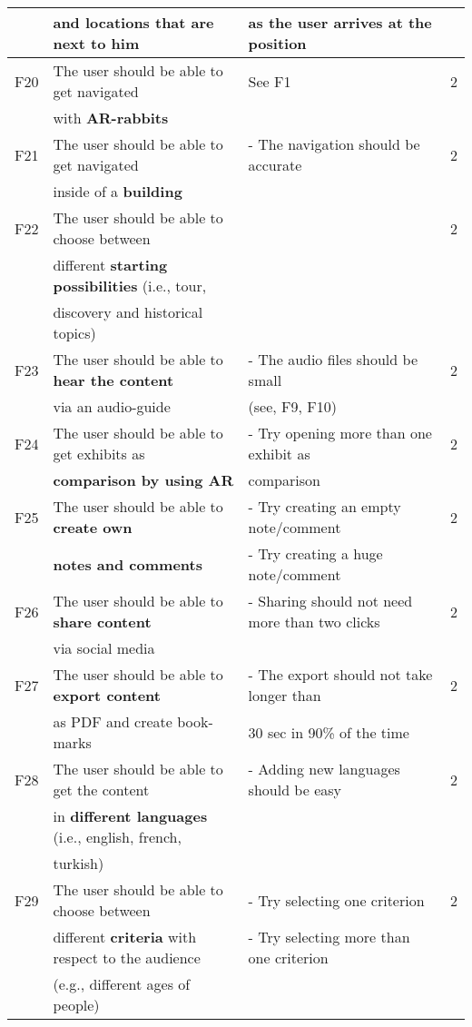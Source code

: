 \documentclass[twoside,openright,fleqn,pointlessnumbers,headinclude,,11pt,a4paper,BCOR5mm,footinclude,cleardoubleempty,abstracton %
                ]{scrreprt}
\begin{document}
\begin{table}[h]
\begin{tabular}{llll}
		& and \textbf{locations that are next to him}				& as the user arrives at the position		& \\
	\hline
	F20 & The user should be able to get navigated 				& See F1  & 2\\
		& with \textbf{AR-rabbits} 							&		& \\
	\hline
	F21 & The user should be able to get navigated  				& - The navigation should be accurate   & 2\\
		& inside of a \textbf{building}							&	& \\
	\hline
	F22 & The user should be able to choose between 			&    & 2\\
		& different \textbf{starting possibilities} (i.e., tour, 			&	& \\
		& discovery and historical topics) 						&	& \\
	\hline
	F23 & The user should be able to \textbf{hear the content} 		& - The audio files should be small  & 2\\
		& via an audio-guide								& (see, F9, F10)	& \\
	\hline
	F24 & The user should be able to get exhibits as 				&  - Try opening more than one exhibit as& 2\\
		& \textbf{comparison by using AR}						& comparison	& \\ 
	\hline
	F25 & The user should be able to \textbf{create own} 			& - Try creating an empty note/comment  & 2\\
		& \textbf{notes and comments}						& - Try creating a huge note/comment	& \\
	\hline
	F26 & The user should be able to \textbf{share content} 		& - Sharing should not need more than two clicks & 2\\
		& via social media									&		& \\
	\hline
	F27 & The user should be able to \textbf{export content} 		& - The export should not take longer than  & 2\\
		& as PDF and create book-marks						& 30 sec in 90\% of the time	& \\
	\hline
	F28 & The user should be able to get the content 				& - Adding new languages should be easy  & 2\\
		& in \textbf{different languages} (i.e., english, french, 		&	& \\
		& turkish) 										&	& \\
	\hline
	F29 & The user should be able to choose between  			& - Try selecting one criterion & 2\\
		& different \textbf{criteria} with respect to the audience 		& - Try selecting more than one criterion	& \\
		& (e.g., different ages of people) 						&	& \\
	\hline
	\end{tabular}
	\label{RequirementsFrontend2}
	\end{table}
	
	
\end{document}
